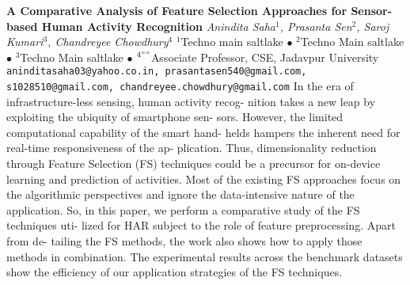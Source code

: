 
    \begin{conf-abstract}[]
        {\textbf{A Comparative Analysis of Feature Selection Approaches for Sensor-based Human Activity Recognition}}
        {\textit{Anindita  Saha$^{1}$, Prasanta Sen$^{2}$, Saroj  Kumari$^{3}$, Chandreyee Chowdhury$^{4}$}}
        {$^{1}$Techno main saltlake $\bullet$ $^{2}$Techno Main saltlake $\bullet$ $^{3}$Techno Main saltlake $\bullet$ $^{4 ""}$Associate Professor, CSE, Jadavpur University}
        {\texttt{aninditasaha03@yahoo.co.in, prasantasen540@gmail.com, s1028510@gmail.com, chandreyee.chowdhury@gmail.com}}
        {In the era of infrastructure-less sensing, human activity recog- nition takes a new leap by exploiting the ubiquity of smartphone sen- sors. However, the limited computational capability of the smart hand- helds hampers the inherent need for real-time responsiveness of the ap- plication. Thus, dimensionality reduction through Feature Selection (FS) techniques could be a precursor for on-device learning and prediction of activities. Most of the existing FS approaches focus on the algorithmic perspectives and ignore the data-intensive nature of the application. So, in this paper, we perform a comparative study of the FS techniques uti- lized for HAR subject to the role of feature preprocessing. Apart from de- tailing the FS methods, the work also shows how to apply those methods in combination. The experimental results across the benchmark datasets show the efficiency of our application strategies of the FS techniques.}
    \end{conf-abstract}
        